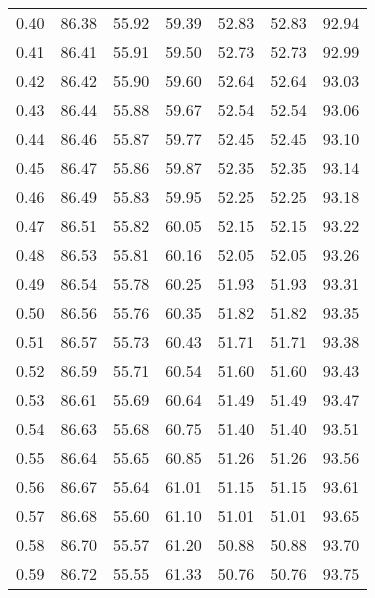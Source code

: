 \begin{tabular}{|c|c|c|c|c|c|c|}
      0.40 &     86.38 &     55.92 &      59.39 &   52.83 &      52.83 &         92.94 \\
      0.41 &     86.41 &     55.91 &      59.50 &   52.73 &      52.73 &         92.99 \\
      0.42 &     86.42 &     55.90 &      59.60 &   52.64 &      52.64 &         93.03 \\
      0.43 &     86.44 &     55.88 &      59.67 &   52.54 &      52.54 &         93.06 \\
      0.44 &     86.46 &     55.87 &      59.77 &   52.45 &      52.45 &         93.10 \\
      0.45 &     86.47 &     55.86 &      59.87 &   52.35 &      52.35 &         93.14 \\
      0.46 &     86.49 &     55.83 &      59.95 &   52.25 &      52.25 &         93.18 \\
      0.47 &     86.51 &     55.82 &      60.05 &   52.15 &      52.15 &         93.22 \\
      0.48 &     86.53 &     55.81 &      60.16 &   52.05 &      52.05 &         93.26 \\
      0.49 &     86.54 &     55.78 &      60.25 &   51.93 &      51.93 &         93.31 \\
      0.50 &     86.56 &     55.76 &      60.35 &   51.82 &      51.82 &         93.35 \\
      0.51 &     86.57 &     55.73 &      60.43 &   51.71 &      51.71 &         93.38 \\
      0.52 &     86.59 &     55.71 &      60.54 &   51.60 &      51.60 &         93.43 \\
      0.53 &     86.61 &     55.69 &      60.64 &   51.49 &      51.49 &         93.47 \\
      0.54 &     86.63 &     55.68 &      60.75 &   51.40 &      51.40 &         93.51 \\
      0.55 &     86.64 &     55.65 &      60.85 &   51.26 &      51.26 &         93.56 \\
      0.56 &     86.67 &     55.64 &      61.01 &   51.15 &      51.15 &         93.61 \\
      0.57 &     86.68 &     55.60 &      61.10 &   51.01 &      51.01 &         93.65 \\
      0.58 &     86.70 &     55.57 &      61.20 &   50.88 &      50.88 &         93.70 \\
      0.59 &     86.72 &     55.55 &      61.33 &   50.76 &      50.76 &         93.75 \\

\end{tabular}

